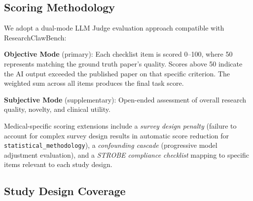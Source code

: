 \documentclass[12pt]{article}
\begin{document}
\subsection{Scoring Methodology}

We adopt a dual-mode LLM Judge evaluation approach compatible with ResearchClawBench:

\textbf{Objective Mode} (primary): Each checklist item is scored 0--100, where 50 represents matching the ground truth paper's quality. Scores above 50 indicate the AI output exceeded the published paper on that specific criterion. The weighted sum across all items produces the final task score.

\textbf{Subjective Mode} (supplementary): Open-ended assessment of overall research quality, novelty, and clinical utility.

Medical-specific scoring extensions include a \textit{survey design penalty} (failure to account for complex survey design results in automatic score reduction for \texttt{statistical\_methodology}), a \textit{confounding cascade} (progressive model adjustment evaluation), and a \textit{STROBE compliance checklist} mapping to specific items relevant to each study design.

\subsection{Study Design Coverage}

\begin{table}[ht]
\centering
\caption{Study design distribution across MedResearchBench Phase 1 tasks.}
\end{table}

\end{document}
